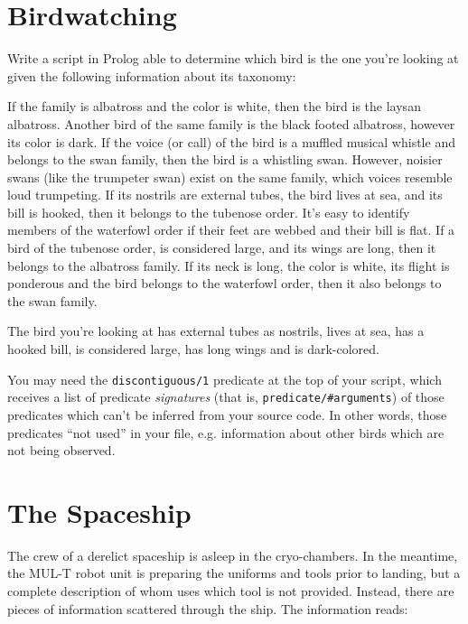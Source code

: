 \documentclass{article}
\begin{document}
\section{Birdwatching}

Write a script in Prolog able to determine which bird is the one you're looking at given the following information about its taxonomy:

If the family is albatross and the color is white, then the bird is the laysan albatross.
Another bird of the same family is the black footed albatross, however its color is dark.
If the voice (or call) of the bird is a muffled musical whistle and belongs to the swan family, then the bird is a whistling swan.
However, noisier swans (like the trumpeter swan) exist on the same family, which voices resemble loud trumpeting.
If its nostrils are external tubes, the bird lives at sea, and its bill is hooked, then it belongs to the tubenose order.
It's easy to identify members of the waterfowl order if their feet are webbed and their bill is flat.
If a bird of the tubenose order, is considered large, and its wings are long, then it belongs to the albatross family.
If its neck is long, the color is white, its flight is ponderous and the bird belongs to the waterfowl order, then it also belongs to the swan family.

The bird you're looking at has external tubes as nostrils, lives at sea, has a hooked bill, is considered large, has long wings and is dark-colored.

You may need the \texttt{discontiguous/1} predicate at the top of your script, which receives a list of predicate \textit{signatures} (that is, \texttt{predicate/\#arguments}) of those predicates which can't be inferred from your source code. In other words, those predicates ``not used'' in your file, e.g. information about other birds which are not being observed.

\pagebreak

\section{The Spaceship}

The crew of a derelict spaceship is asleep in the cryo-chambers.
In the meantime, the MUL-T robot unit is preparing the uniforms and tools prior to landing, but a complete description of whom uses which tool is not provided. Instead, there are pieces of information scattered through the ship. The information reads:
\end{document}
